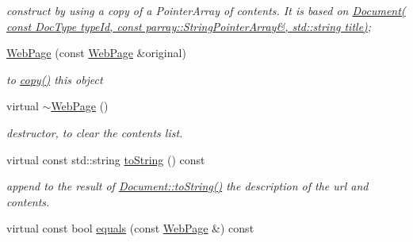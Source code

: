 \begin{DoxyCompactItemize}
\begin{DoxyCompactList}\small\item\em construct by using a copy of a Pointer\-Array of contents. It is based on \hyperlink{classdocs_1_1Document_a4a76d0cee2709582e4b9f3b5b8db0277}{Document( const Doc\-Type type\-Id, const parray\-::\-String\-Pointer\-Array\&, std\-::string title)}; \end{DoxyCompactList}\item 
\hypertarget{classdocs_1_1WebPage_a4c2ea40e27d1763d3f7c2c5055518a41}{\hyperlink{classdocs_1_1WebPage_a4c2ea40e27d1763d3f7c2c5055518a41}{Web\-Page} (const \hyperlink{classdocs_1_1WebPage}{Web\-Page} \&original)}\label{classdocs_1_1WebPage_a4c2ea40e27d1763d3f7c2c5055518a41}

\begin{DoxyCompactList}\small\item\em to \hyperlink{classdocs_1_1WebPage_a52ac0dc90ab3f5621d0fa41d8386806c}{copy()} this object \end{DoxyCompactList}\item 
\hypertarget{classdocs_1_1WebPage_a20af4ea1f7d488ae695b316a604ea6ad}{virtual \hyperlink{classdocs_1_1WebPage_a20af4ea1f7d488ae695b316a604ea6ad}{$\sim$\-Web\-Page} ()}\label{classdocs_1_1WebPage_a20af4ea1f7d488ae695b316a604ea6ad}

\begin{DoxyCompactList}\small\item\em destructor, to clear the contents list. \end{DoxyCompactList}\item 
\hypertarget{classdocs_1_1WebPage_ac3d747b84fa4e357791faab5994ccc22}{virtual const std\-::string \hyperlink{classdocs_1_1WebPage_ac3d747b84fa4e357791faab5994ccc22}{to\-String} () const }\label{classdocs_1_1WebPage_ac3d747b84fa4e357791faab5994ccc22}

\begin{DoxyCompactList}\small\item\em append to the result of \hyperlink{classdocs_1_1Document_a16db383045038b779eb489ad125ef02b}{Document\-::to\-String()} the description of the url and contents. \end{DoxyCompactList}\item 
\hypertarget{classdocs_1_1WebPage_aaced244fd624030e82026ba294282615}{virtual const bool \hyperlink{classdocs_1_1WebPage_aaced244fd624030e82026ba294282615}{equals} (const \hyperlink{classdocs_1_1WebPage}{Web\-Page} \&) const }\label{classdocs_1_1WebPage_aaced244fd624030e82026ba294282615}


\end{DoxyCompactItemize}
